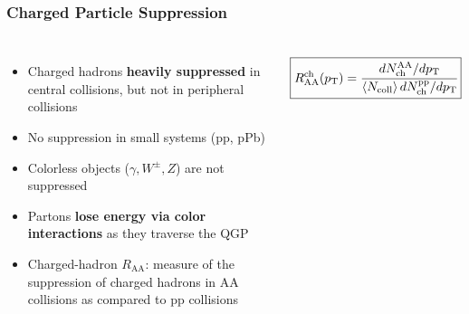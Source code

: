 \begin{frame}
  \frametitle{\textbf{Charged Particle Suppression}}
  \begin{columns}
    \begin{itemize}
    \item Charged hadrons \textbf{heavily suppressed} in central collisions, but not in peripheral collisions
    \item No suppression in small systems (pp, pPb)
    \item Colorless objects ($\gamma, W^{\pm}, Z$) are not suppressed
    \item Partons \textbf{lose energy via color interactions} as they traverse the QGP 
    \item Charged-hadron $R_{\text{AA}}$: measure of the suppression of charged hadrons in AA collisions as compared to pp collisions
    \end{itemize}
    \begin{align*}
      \boxed{R_{\text{AA}}^{\text{ch}} (p_{\text{T}}) = \cfrac{dN^{\text{AA}}_{\text{ch}} / dp_{\text{T}}}{\left< N_{\text{coll}} \right> dN^{\text{pp}}_{\text{ch}} / dp_{\text{T}}}}
    \end{align*}
  \end{columns}
\end{frame}
